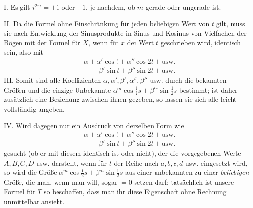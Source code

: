 I. Es gilt $i^{2m}=+1$ oder $-1$, je nachdem, ob $m$ gerade oder ungerade ist.

II. Da die Formel ohne Einschränkung für jeden beliebigen Wert von $t$ gilt, muss sie nach
Entwicklung der Sinusprodukte in Sinus und Kosinus von Vielfachen der Bögen mit der Formel
für $X$, wenn für $x$ der Wert $t$ geschrieben wird, identisch sein, also mit
\[
\begin{aligned}
&\alpha+\alpha'\cos t+\alpha''\cos2t+\text{usw.}\\[5pt]
&\quad+\beta'\sin t+\beta''\sin2t+\text{usw.}
\end{aligned}
\]
III. Somit sind alle Koeffizienten $\alpha,\alpha',\beta',\alpha'',\beta''$ usw. durch die bekannten Größen und die einzige Unbekannte
$\alpha^m\cos\tfrac12s+\beta^m\sin\tfrac12s$ bestimmt; ist daher
zusätzlich eine Beziehung zwischen ihnen gegeben, so lassen sie sich alle leicht vollständig angeben.
\par{}
IV. Wird dagegen nur ein Ausdruck von derselben Form wie
\[
\begin{aligned}
&\alpha+\alpha'\cos t+\alpha''\cos2t+\text{usw.}\\[5pt]
&\quad+\beta'\sin t+\beta''\sin2t+\text{usw.}
\end{aligned}
\]
gesucht (ob er mit diesem identisch ist oder nicht), der die vorgegebenen Werte
$A,B,C,D$ usw. darstellt, wenn für $t$ der Reihe nach $a,b,c,d$ usw. eingesetzt wird, so wird die Größe
$\alpha^m\cos\tfrac12s+\beta^m\sin\tfrac12s$ aus einer unbekannten zu einer \emph{beliebigen} Größe, die man, wenn man will, sogar $=0$
setzen darf; tatsächlich ist unsere Formel für $T$ so beschaffen, dass man ihr diese Eigenschaft ohne
Rechnung unmittelbar ansieht.

\endgroup
